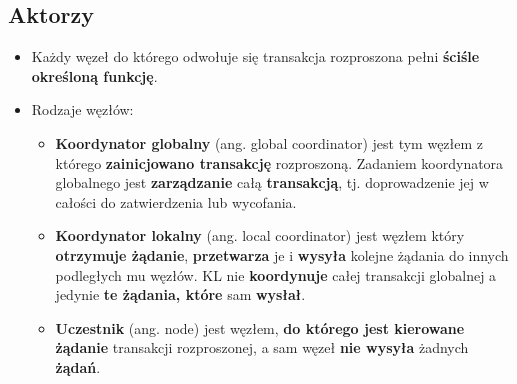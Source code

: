 \documentclass[a4paper]{article}
\begin{document}
    \subsection{Aktorzy}
    \begin{itemize}[noitemsep]
        \item Każdy węzeł do którego odwołuje się transakcja rozproszona pełni \textbf{ściśle określoną funkcję}.
        \item Rodzaje węzłów:
        \begin{itemize}[noitemsep]
            \item \textbf{Koordynator globalny} (ang. global coordinator) jest tym węzłem z którego
            \textbf{zainicjowano transakcję} rozproszoną. Zadaniem koordynatora globalnego jest
            \textbf{zarządzanie} całą \textbf{transakcją}, tj. doprowadzenie jej w całości do zatwierdzenia lub
            wycofania.

            \item \textbf{Koordynator lokalny} (ang. local coordinator) jest węzłem który \textbf{otrzymuje
            żądanie}, \textbf{przetwarza} je i \textbf{wysyła} kolejne żądania do innych podległych mu
            węzłów. KL nie \textbf{koordynuje} całej transakcji globalnej a jedynie \textbf{te żądania, które}
            sam \textbf{wysłał}.

            \item \textbf{Uczestnik} (ang. node) jest węzłem, \textbf{do którego jest kierowane żądanie} transakcji
            rozproszonej, a sam węzeł \textbf{nie wysyła} żadnych \textbf{żądań}.


\end{itemize}
\end{itemize}
\end{document}

